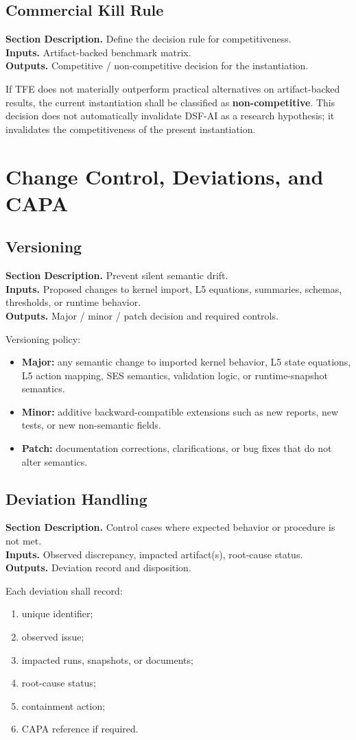 \documentclass[11pt]{report}
\newcommand{\meta}[3]{\textbf{Section Description.} #1\\
\textbf{Inputs.} #2\\
\textbf{Outputs.} #3\par}
\begin{document}
\section{Commercial Kill Rule}
\meta{Define the decision rule for competitiveness.}{Artifact-backed benchmark matrix.}{Competitive / non-competitive decision for the instantiation.}

If TFE does not materially outperform practical alternatives on artifact-backed results, the current instantiation shall be classified as \textbf{non-competitive}. This decision does not automatically invalidate DSF-AI as a research hypothesis; it invalidates the competitiveness of the present instantiation.

\chapter{Change Control, Deviations, and CAPA}
\section{Versioning}
\meta{Prevent silent semantic drift.}{Proposed changes to kernel import, L5 equations, summaries, schemas, thresholds, or runtime behavior.}{Major / minor / patch decision and required controls.}

Versioning policy:
\begin{itemize}
    \item \textbf{Major:} any semantic change to imported kernel behavior, L5 state equations, L5 action mapping, SES semantics, validation logic, or runtime-snapshot semantics.
    \item \textbf{Minor:} additive backward-compatible extensions such as new reports, new tests, or new non-semantic fields.
    \item \textbf{Patch:} documentation corrections, clarifications, or bug fixes that do not alter semantics.
\end{itemize}

\section{Deviation Handling}
\meta{Control cases where expected behavior or procedure is not met.}{Observed discrepancy, impacted artifact(s), root-cause status.}{Deviation record and disposition.}

Each deviation shall record:
\begin{enumerate}[leftmargin=1.2cm]
    \item unique identifier;
    \item observed issue;
    \item impacted runs, snapshots, or documents;
    \item root-cause status;
    \item containment action;
    \item CAPA reference if required.
\end{enumerate}
\end{document}
